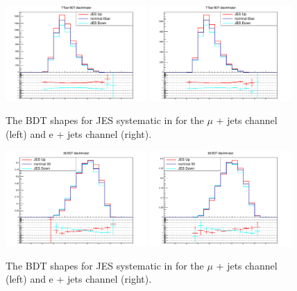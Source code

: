 \begin{figure}[ht!]
    \includegraphics[width=0.48\textwidth]{images/Run2/Sys/JESsystt.pdf}
    \includegraphics[width=0.48\textwidth]{images/Run2/Sys/JESsystt_e.pdf}     
    \caption{The BDT shapes for JES systematic in \ttbar for the $\mu$ + jets channel (left) and e + jets channel (right).}
    \label{fig:SysShapesJEStt}
\end{figure}

\begin{figure}[ht!]
    \includegraphics[width=0.48\textwidth]{images/Run2/Sys/JESsystttt.pdf}
    \includegraphics[width=0.48\textwidth]{images/Run2/Sys/JESsystttt_e.pdf}     
    \caption{The BDT shapes for JES systematic in \tttt for the $\mu$ + jets channel (left) and e + jets channel (right).}
    \label{fig:SysShapesJEStttt}
\end{figure}

